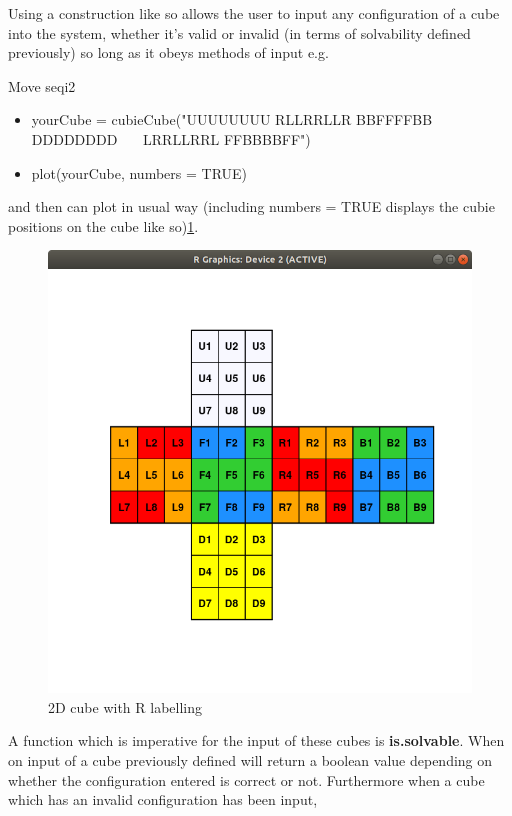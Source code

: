 \documentclass{article}
\begin{document}
\newpage
Using a construction like so allows the user to input any configuration of a cube into the system, whether it's valid or invalid (in terms of solvability defined previously) so long as it obeys methods of input e.g.



\begin{myinput}{Move seq}{i2}
\begin{itemize}
\item yourCube = cubieCube("UUUUUUUU RLLRRLLR BBFFFFBB DDDDDDDD \ \ \ LRRLLRRL FFBBBBFF")
\item plot(yourCube, numbers = TRUE)
\end{itemize}
\end{myinput}

and then can plot in usual way (including numbers = TRUE displays the cubie positions on the cube like so)\ref{fig:labelled}.
\begin{figure}[h]
	\centering
	\includegraphics[scale=.5]{labelledcube.png}
	\caption{2D cube with R labelling}				    
	\label{fig:labelled}
\end{figure}
\newpage
A function which is imperative for the input of these cubes is \textbf{is.solvable}. When on input of a cube previously defined will return a boolean value depending on whether the configuration entered is correct or not.
Furthermore when a cube which has an invalid configuration has been input, 
%
\end{document}
